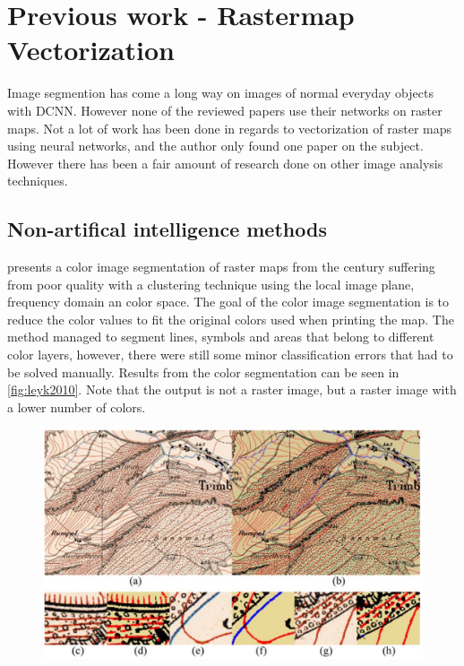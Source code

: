 \chapter{Previous work - Rastermap Vectorization}
Image segmention has come a long way on images of normal everyday objects with DCNN. However none of the reviewed papers use their networks on raster maps. Not a lot of work has been done in regards to vectorization of raster maps using neural networks, and the author only found one paper on the subject. However there has been a fair amount of research done on other image analysis techniques.

\section{Non-artifical intelligence methods}

\citet{Leyk2010} presents a color image segmentation of raster maps from the  century suffering from poor quality with a clustering technique using the local image plane, frequency domain an color space. The goal of the color image segmentation is to reduce the color values to fit the original colors used when printing the map. The method managed to segment lines, symbols and areas that belong to different color layers, however, there were still some minor classification errors that had to be solved manually. Results from the color segmentation can be seen in \autoref{fig:leyk2010}. Note that the output is not a raster image, but a raster image with a lower number of colors.

\begin{figure}[H]
	\centering
	\includegraphics[width=0.8\linewidth]{fig/leyk2010.png}
	\label{fig:leyk2010}
\end{figure}


